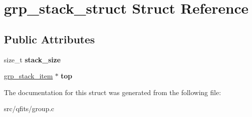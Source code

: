 \hypertarget{structgrp__stack__struct}{}\section{grp\+\_\+stack\+\_\+struct Struct Reference}
\label{structgrp__stack__struct}
\subsection*{Public Attributes}
\begin{DoxyCompactItemize}
\item 
\mbox{\label{structgrp__stack__struct_af512fc80a8d80976c33e41cc7140d745}} 
size\+\_\+t {\bfseries stack\+\_\+size}
\item 
\mbox{\label{structgrp__stack__struct_ae2445f74d6d6508d962e5cedd52c9daf}} 
\hyperlink{structgrp__stack__item__struct}{grp\+\_\+stack\+\_\+item} $\ast$ {\bfseries top}
\end{DoxyCompactItemize}


The documentation for this struct was generated from the following file\+:\begin{DoxyCompactItemize}
\item 
src/qfits/group.\+c\end{DoxyCompactItemize}
